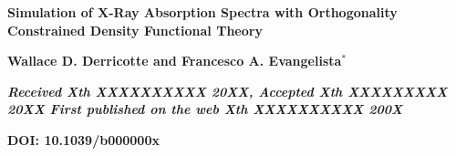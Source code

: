\documentclass[12pt]{article}
\begin{document}
\noindent\LARGE{\textbf{Simulation of X-Ray Absorption Spectra with Orthogonality Constrained Density Functional Theory
}} 
\vspace{0.6cm}

\noindent\large{\textbf{Wallace D. Derricotte and Francesco A. Evangelista$^{\ast}$}}\vspace{0.5cm}


\noindent\textit{\small{\textbf{Received Xth XXXXXXXXXX 20XX, Accepted Xth XXXXXXXXX 20XX\newline
First published on the web Xth XXXXXXXXXX 200X}}}

\noindent \textbf{\small{DOI: 10.1039/b000000x}}
\vspace{0.6cm}
\end{document}
